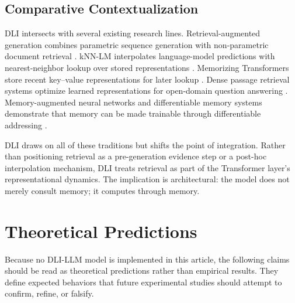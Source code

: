 \subsection{Comparative Contextualization}
DLI intersects with several existing research lines. Retrieval-augmented generation combines parametric sequence generation with non-parametric document retrieval \cite{Lewis2021}. kNN-LM interpolates language-model predictions with nearest-neighbor lookup over stored representations \cite{Khandelwal2020}. Memorizing Transformers store recent key--value representations for later lookup \cite{Wu2022}. Dense passage retrieval systems optimize learned representations for open-domain question answering \cite{Qu2021}. Memory-augmented neural networks and differentiable memory systems demonstrate that memory can be made trainable through differentiable addressing \cite{Graves2014, Graves2016, Santoro2016}.

DLI draws on all of these traditions but shifts the point of integration. Rather than positioning retrieval as a pre-generation evidence step or a post-hoc interpolation mechanism, DLI treats retrieval as part of the Transformer layer's representational dynamics. The implication is architectural: the model does not merely consult memory; it computes through memory.

\section{Theoretical Predictions}
Because no DLI-LLM model is implemented in this article, the following claims should be read as theoretical predictions rather than empirical results. They define expected behaviors that future experimental studies should attempt to confirm, refine, or falsify.

